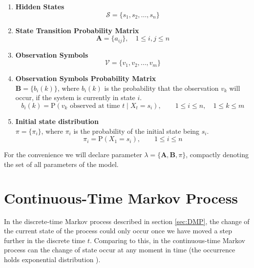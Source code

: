\documentclass[thesis=M,english]{FITthesis}[2012/10/20]
\newcommand{\matr}[1]{\mathbf{#1}}
\begin{document}
\begin{enumerate}[resume]
\setcounter{enumi}{0}
\item \textbf{Hidden States}
\begin{equation}
\mathcal{S} = \{ s_1,s_2, \dots, s_n \}
\end{equation} 
\item \textbf{State Transition Probability Matrix}
\begin{equation}\label{eq:tp}
\matr{A} = \{ a_{ij} \}, \quad 1 \leq i,j \leq n
\end{equation} 
\item \textbf{Observation Symbols}
\begin{equation}
\mathcal{V} = \{ v_1,v_2, \dots, v_m \} 
\end{equation}
\item \textbf{Observation Symbols Probability Matrix} \\
$\matr{B} = \{ b_{i}(k) \}$, where $b_{i}(k)$ is the probability that the observation $v_k$ will occur, if the system is currently in state $i$. 
\begin{equation}
b_i(k) = \mathrm{P}(v_k \text{ observed at time }t \mid X_t = s_i), \qquad 1 \leq i \leq n, \quad 1 \leq k \leq m
\end{equation}
\item \textbf{Initial state distribution} \\
$\pi = \{ \pi_i \}$, where $\pi_i$ is the probability of the initial state being $s_i$.
\begin{equation}
\pi_{i} = \mathrm{P}(X_1 = s_i), \qquad 1 \leq i \leq n
\end{equation}
\end{enumerate}

For the convenience we will declare parameter $\lambda = \{\matr{A},\matr{B},\pi\}$, compactly denoting the set of all parameters of the model. 

\section{Continuous-Time Markov Process}\label{sec:ctmp}

In the discrete-time Markov process described in section \ref{sec:DMP}, the change of the current state of the process could only occur once we have moved a step further in the discrete time $t$. Comparing to this, in the continuous-time Markov process can the change of state occur at any moment in time (the occurrence holds exponential distribution ).
\end{document}
